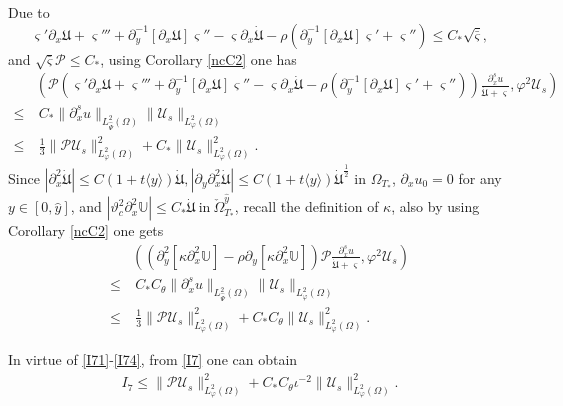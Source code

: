 \documentclass{amsart}
\numberwithin{equation}{section}
\newcommand\y{{{\langle y \rangle}}}
\begin{document}
Due to
$$\varsigma'\partial_{x}\mathfrak{U}+\varsigma'''+\partial_{y}^{-1}[\partial_{x}\mathfrak{U}]\varsigma''-\varsigma\partial_{x}\dot{\mathfrak{U}}
  -\rho\left(\partial_{y}^{-1}[\partial_{x}\mathfrak{U}]\varsigma'+\varsigma''\right)\leq C_{*}\sqrt{\bar{\varsigma}},$$
and $\sqrt{\bar{\varsigma}}\mathcal{P}\leq C_{*}$, using Corollary \ref{ncC2} one has
\begin{align}\label{I73}
&\left(\mathcal{P}\left(\varsigma'\partial_{x}\mathfrak{U}+\varsigma'''+\partial_{y}^{-1}[\partial_{x}\mathfrak{U}]\varsigma''-\varsigma\partial_{x}\dot{\mathfrak{U}}
  -\rho\left(\partial_{y}^{-1}[\partial_{x}\mathfrak{U}]\varsigma'+\varsigma''\right)\right)\frac{\partial_{x}^{s}u}{\dot{\mathfrak{U}}+\varsigma},\varphi^{2}\mathcal{U}_{s}\right)\\
\leq&~C_{*}\|\partial_{x}^{s}u\|_{L_{\hat{\Psi}}^{2}(\Omega)}\|\mathcal{U}_{s}\|_{L_{\varphi}^{2}(\Omega)}\nonumber\\
\leq&~\frac{1}{3}\|\mathcal{P}\mathcal{U}_{s}\|_{L_{\varphi}^{2}(\Omega)}^{2}
     +C_{*}\|\mathcal{U}_{s}\|_{L_{\varphi}^{2}(\Omega)}^{2}.\nonumber
\end{align}
Since $|\partial_{x}^{2}\dot{\mathfrak{U}}|\leq C(1+t\y)\dot{\mathfrak{U}}, |\partial_{y}\partial_{x}^{2}\dot{\mathfrak{U}}|\leq C(1+t\y)\dot{\mathfrak{U}}^{\frac{1}{2}}$ in $\Omega_{T_{*}}$, $\partial_{x}u_{0}=0$ for any $y\in[0,\hat{y}]$,
 and
$|\vartheta_{c}^{2}\partial_{x}^{2}\mathbb{U}|\leq C_{*}\dot{\mathfrak{U}}~\text{in}~\check{\Omega}_{T_{*}}^{\hat{y}}$,
recall the definition of $\kappa$, also by using Corollary \ref{ncC2} one gets
\begin{align}\label{I74}
&\left((\partial_{y}^{2}[\kappa\partial_{x}^{2}\mathbb{U}]-\rho\partial_{y}[\kappa\partial_{x}^{2}\mathbb{U}])\mathcal{P}\frac{\partial_{x}^{s}u}{\dot{\mathfrak{U}}+\varsigma},\varphi^{2}\mathcal{U}_{s}\right)\\
\leq&~C_{*}C_{\theta}\|\partial_{x}^{s}u\|_{L_{\hat{\Psi}}^{2}(\Omega)}\|\mathcal{U}_{s}\|_{L_{\varphi}^{2}(\Omega)}\nonumber\\
\leq&~\frac{1}{3}\|\mathcal{P}\mathcal{U}_{s}\|_{L_{\varphi}^{2}(\Omega)}^{2}
     +C_{*}C_{\theta}\|\mathcal{U}_{s}\|_{L_{\varphi}^{2}(\Omega)}^{2}.\nonumber
\end{align}

In virtue of \eqref{I71}-\eqref{I74}, from \eqref{I7} one can obtain
\begin{align*}
I_{7}\leq \|\mathcal{P}\mathcal{U}_{s}\|_{L_{\varphi}^{2}(\Omega)}^{2}
         +C_{*}C_{\theta}\iota^{-2}\|\mathcal{U}_{s}\|_{L_{\varphi}^{2}(\Omega)}^{2}.
\end{align*}
\end{document}
